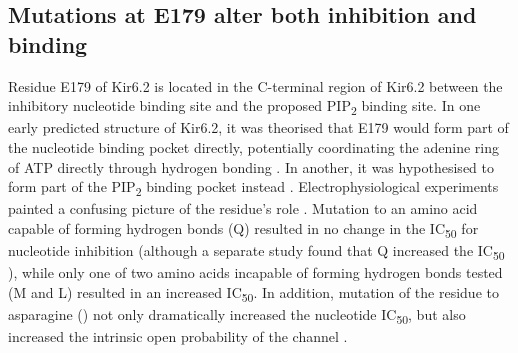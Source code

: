\subsection{Mutations at E179 alter both inhibition and binding}

Residue E179 of Kir6.2 is located in the C-terminal region of Kir6.2 between the inhibitory nucleotide binding site and the proposed PIP\textsubscript{2} binding site.
In one early predicted structure of Kir6.2, it was theorised that E179 would form part of the nucleotide binding pocket directly, potentially coordinating the adenine ring of ATP directly through hydrogen bonding \cite{antcliff_functional_2005}.
In another, it was hypothesised to form part of the PIP\textsubscript{2} binding pocket instead \cite{haider_identification_2007}.
Electrophysiological experiments painted a confusing picture of the residue's role \cite{antcliff_functional_2005}.
Mutation to an amino acid capable of forming hydrogen bonds (Q) resulted in no change in the IC\textsubscript{50} for nucleotide inhibition (although a separate study found that Q increased the IC\textsubscript{50} \cite{proks_involvement_1999}), while only one of two amino acids incapable of forming hydrogen bonds tested (M and L) resulted in an increased IC\textsubscript{50}.
In addition, mutation of the residue to asparagine () not only dramatically increased the nucleotide IC\textsubscript{50}, but also increased the intrinsic open probability of the channel \cite{antcliff_functional_2005}.

